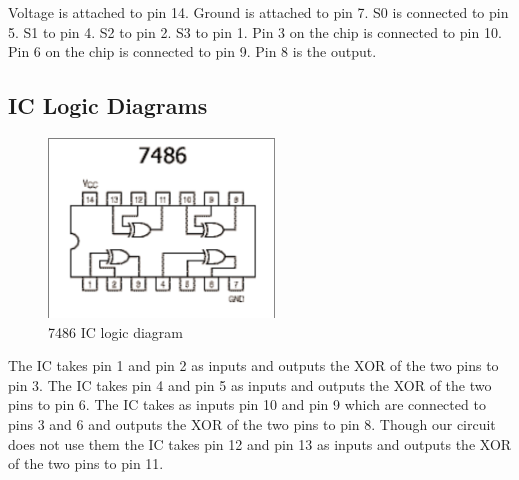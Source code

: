 \documentclass[11pt,a4paper]{article}
\begin{document}
Voltage is attached to pin 14. Ground is attached to pin 7. S0 is connected
to pin 5. S1 to pin 4. S2 to pin 2. S3 to pin 1. Pin 3 on the chip is connected
to pin 10. Pin 6 on the chip is connected to pin 9. Pin 8 is the output.

\subsection{IC Logic Diagrams}
\begin{figure}[ht!]
    \centering
    \includegraphics[width=6cm]{logic.png}
    \caption{7486 IC logic diagram}
\end{figure}
The IC takes pin 1 and pin 2 as inputs and outputs the XOR of the two pins to pin 3.
The IC takes pin 4 and pin 5 as inputs and outputs the XOR of the two pins to pin 6.
The IC takes as inputs pin 10 and pin 9 which are connected to pins 3 and 6 and outputs
the XOR of the two pins to pin 8.
Though our circuit does not use them the IC takes pin 12 and pin 13 as inputs and
outputs the XOR of the two pins to pin 11.
\end{document}
